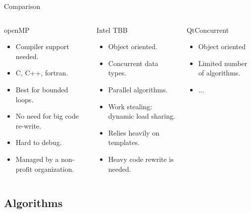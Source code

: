 \documentclass{beamer}
\begin{document}
\begin{frame}{Comparison}

\begin{columns}[t]
\column{1.5in}

\begin{block}{openMP}
\small 
\begin{itemize}
  \item Compiler support needed.
  \item C, C++, fortran.
  \item Best for bounded loops.
  \item No need for big code re-write.
  \item Hard to debug.
  \item Managed by a non-profit organization.
\end{itemize}
\end{block}
\column{1.5in}


\begin{block}{Intel TBB}
\small
\begin{itemize}
  \item Object oriented.
  \item Concurrent data types.
  \item Parallel algorithms.
  \item Work stealing: dynamic load sharing.
  \item Relies heavily on templates.
  \item Heavy code rewrite is needed.
\end{itemize}
\end{block}

\column{1.5in}

\begin{block}{QtConcurrent}
\small
\begin{itemize}
  \item Object oriented
  \item Limited number of algorithms.
  \item ...
\end{itemize}
\end{block}

\end{columns}

\end{frame}


\subsection{Algorithms}
\end{document}
